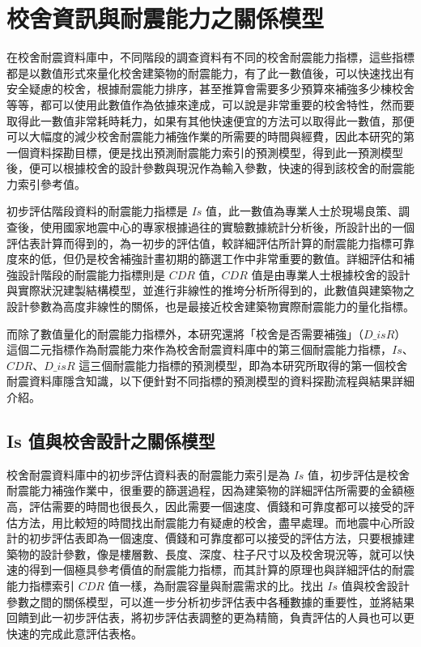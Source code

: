 \renewcommand\thetable{\arabic{chapter}-\arabic{table}}
\chapter{校舍資訊與耐震能力之關係模型}

在校舍耐震資料庫中，不同階段的調查資料有不同的校舍耐震能力指標，這些指標都是以數值形式來量化校舍建築物的耐震能力，有了此一數值後，可以快速找出有安全疑慮的校舍，根據耐震能力排序，甚至推算會需要多少預算來補強多少棟校舍等等，都可以使用此數值作為依據來達成，可以說是非常重要的校舍特性，然而要取得此一數值非常耗時耗力，如果有其他快速便宜的方法可以取得此一數值，那便可以大幅度的減少校舍耐震能力補強作業的所需要的時間與經費，因此本研究的第一個資料探勘目標，便是找出預測耐震能力索引的預測模型，得到此一預測模型後，便可以根據校舍的設計參數與現況作為輸入參數，快速的得到該校舍的耐震能力索引參考值。

初步評估階段資料的耐震能力指標是 $Is$ 值，此一數值為專業人士於現場良策、調查後，使用國家地震中心的專家根據過往的實驗數據統計分析後，所設計出的一個評估表計算而得到的，為一初步的評估值，較詳細評估所計算的耐震能力指標可靠度來的低，但仍是校舍補強計畫初期的篩選工作中非常重要的數值。詳細評估和補強設計階段的耐震能力指標則是 $CDR$ 值，$CDR$ 值是由專業人士根據校舍的設計與實際狀況建製結構模型，並進行非線性的推垮分析所得到的，此數值與建築物之設計參數為高度非線性的關係，也是最接近校舍建築物實際耐震能力的量化指標。

而除了數值量化的耐震能力指標外，本研究還將「校舍是否需要補強」（$D\_isR$）這個二元指標作為耐震能力來作為校舍耐震資料庫中的第三個耐震能力指標，$Is$、$CDR$、$D\_isR$ 這三個耐震能力指標的預測模型，即為本研究所取得的第一個校舍耐震資料庫隱含知識，以下便針對不同指標的預測模型的資料探勘流程與結果詳細介紹。

\section{Is 值與校舍設計之關係模型}

校舍耐震資料庫中的初步評估資料表的耐震能力索引是為 $Is$ 值，初步評估是校舍耐震能力補強作業中，很重要的篩選過程，因為建築物的詳細評估所需要的金額極高，評估需要的時間也很長久，因此需要一個速度、價錢和可靠度都可以接受的評估方法，用比較短的時間找出耐震能力有疑慮的校舍，盡早處理。而地震中心所設計的初步評估表即為一個速度、價錢和可靠度都可以接受的評估方法，只要根據建築物的設計參數，像是樓層數、長度、深度、柱子尺寸以及校舍現況等，就可以快速的得到一個極具參考價值的耐震能力指標，而其計算的原理也與詳細評估的耐震能力指標索引 $CDR$ 值一樣，為耐震容量與耐震需求的比。找出 $Is$ 值與校舍設計參數之間的關係模型，可以進一步分析初步評估表中各種數據的重要性，並將結果回饋到此一初步評估表，將初步評估表調整的更為精簡，負責評估的人員也可以更快速的完成此意評估表格。

